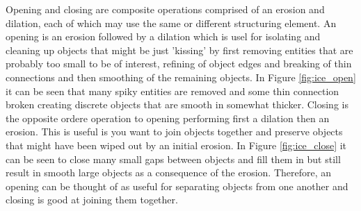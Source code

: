 Opening and closing are composite operations comprised of an erosion and dilation, each of which may use the same or different structuring element. An opening is an erosion followed by a dilation which is usel for isolating and cleaning up objects that might be just 'kissing' by first removing entities that are probably too small to be of interest, refining of object edges and breaking of thin connections and then smoothing of the remaining objects. In Figure \ref{fig:ice_open} it can be seen that many spiky entities are removed and some thin connection broken creating discrete objects that are smooth in somewhat thicker. Closing is the opposite ordere operation to opening performing first a dilation then an erosion. This is useful is you want to join objects together and preserve objects that might have been wiped out by an initial erosion. In Figure \ref{fig:ice_close} it can be seen to close many small gaps between objects and fill them in but still result in smooth large objects as a consequence of the erosion. Therefore, an opening can be thought of as useful for separating objects from one another and closing is good at joining them together. 

